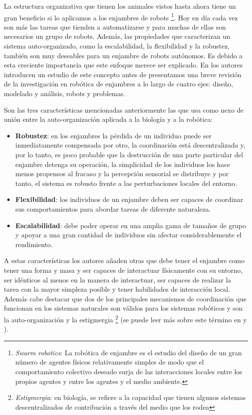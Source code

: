 La estructura organizativa que tienen los animales vistos hasta ahora tiene un gran beneficio si lo aplicamos a los enjambres de robots \footnote{\textit{Swarm robotics}: La robótica de enjambre es el estudio del diseño de un gran número de agentes físicos relativamente simples de modo que el comportamiento colectivo deseado surja de las interacciones locales entre los propios agentes y entre los agentes y el medio ambiente.\cite{csahin2004swarm}}. Hoy en día cada vez son más las tareas que tienden a automatizarse y para muchas de ellas son necesarios un grupo de robots. Además, las propiedades que caracterizan un sistema auto-organizado, como la escalabilidad, la flexibilidad y la robustez, también son muy deseables para un enjambre de robots autónomos. Es debido a esta creciente importancia que este enfoque merece ser explicado. En \cite{christian2008swarm} los autores introducen un estudio de este concepto antes de presentamos una breve revisión de la investigación en robótica de enjambres a lo largo de cuatro ejes: diseño, modelado y análisis, robots y problemas.

Son las tres características mencionadas anteriormente las que usa como nexo de unión entre la auto-organización aplicada a la biología y a la robótica: 

\begin{itemize}
    \item \textbf{Robustez}: en los enjambres la pérdida de un individuo puede ser inmediatamente compensada por otro, la coordinación está descentralizada y, por lo tanto, es poco probable que la destrucción de una parte particular del enjambre detenga su operación, la simplicidad de los individuos los hace menos propensos al fracaso y la percepción sensorial se distribuye y por tanto, el sistema es robusto frente a las perturbaciones locales del entorno.
    \item \textbf{Flexibilidad}: los individuos de un enjambre deben ser capaces de coordinar sus comportamientos para abordar tareas de diferente naturaleza.
    \item \textbf{Escalabilidad}: debe poder operar en una amplia gama de tamaños de grupo y apoyar a una gran cantidad de individuos sin afectar considerablemente el rendimiento.
\end{itemize}

A estas características los autores añaden otras que debe tener el enjambre como tener una forma y masa y ser capaces de interactuar físicamente con su entorno, ser idénticos al menos en la manera de interactuar, ser capaces de realizar la tarea con la mayor simpleza posible y tener habilidades de interacción local. Además cabe destacar que dos de los principales mecanismos de coordinación que funcionan en los sistemas naturales son válidos para los sistemas robóticos y son la auto-organización y la estigmergia \footnote{\textit{Estigmergia}: en biología, se refiere a la capacidad que tienen algunos sistemas descentralizados de contribución a través del medio que los rodea} (se puede leer más sobre este término en \cite{estigmergia1} y \cite{estigmergia2}). 

